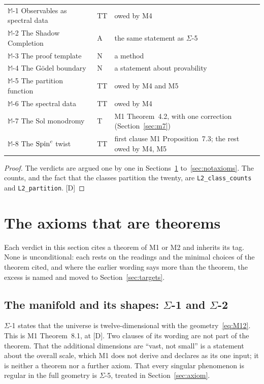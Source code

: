 \documentclass[11pt,a4paper]{article}
\theoremstyle{plain}
\theoremstyle{definition}
\theoremstyle{remark}
\newcommand{\rigD}{[\textup{D}]}
\newcommand{\Max}[1]{$\mathbb{M}$-#1}
\newcommand{\Sig}[1]{$\Sigma$-#1}
\begin{document}
\begin{table}[t]
\begin{center}
\begin{tabular}{@{}p{}lp{}@{}}
\Max{1} Observables as spectral data & TT & owed by M4 \\
\Max{2} The Shadow Completion & A & the same statement as \Sig{5} \\
\Max{3} The proof template & N & a method \\
\Max{4} The G\"odel boundary & N & a statement about provability \\
\Max{5} The partition function & TT & owed by M4 and M5 \\
\Max{6} The spectral data & TT & owed by M4 \\
\Max{7} The Sol monodromy & T & M1 Theorem~4.2, with one correction (Section~\ref{sec:m7}) \\
\Max{8} The $\text{Spin}^c$ twist & TT & first clause M1 Proposition~7.3; the rest owed by M4, M5 \\
\bottomrule
\end{tabular}
\end{center}
\end{table}

\begin{proof}
The verdicts are argued one by one in Sections~\ref{sec:theorems} to~\ref{sec:notaxioms}. The counts, and the fact that the classes partition the twenty, are \texttt{L2\_class\_counts} and \texttt{L2\_partition}. \rigD
\end{proof}

\section{The axioms that are theorems}\label{sec:theorems}

Each verdict in this section cites a theorem of M1 or M2 and inherits its tag. None is unconditional: each rests on the readings and the minimal choices of the theorem cited, and where the earlier wording says more than the theorem, the excess is named and moved to Section~\ref{sec:targets}.

\subsection{The manifold and its shapes: \texorpdfstring{$\Sigma$}{Sigma}-1 and \texorpdfstring{$\Sigma$}{Sigma}-2}\label{sec:shapes}

\Sig{1} states that the universe is twelve-dimensional with the geometry~\eqref{eq:M12}. This is M1 Theorem~8.1, at \rigD. Two clauses of its wording are not part of the theorem. That the additional dimensions are ``vast, not small'' is a statement about the overall scale, which M1 does not derive and declares as its one input; it is neither a theorem nor a further axiom. That every singular phenomenon is regular in the full geometry is \Sig{5}, treated in Section~\ref{sec:axiom}.
\end{document}
